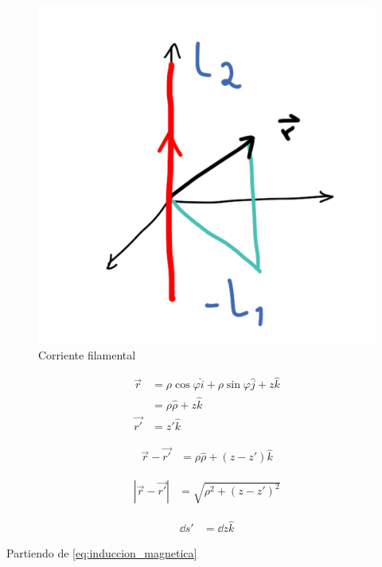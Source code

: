 \documentclass[11pt]{report}
\theoremstyle{plain}
\theoremstyle{definition}
\begin{document}
	\begin{figure}[!h]
		\centering
		\includegraphics[scale=0.15]{Ejercicio3.png}
		\caption{Corriente filamental}
		\label{fig:Ejercicio3}
	\end{figure}

\begin{align*} %
	\vec{r} &= \rho\cos{\varphi}\hat{i} + \rho\sin{\varphi}\hat{j} + z\hat{k}\\
	&= \rho\hat{\rho} + z\hat{k}\\
	\vec{r'} &= z'\hat{k}
\end{align*}

\begin{align*} %
	\vec{r} -\vec{r'} &= \rho\hat{\rho} + \left(z- z'\right)\hat{k}
\end{align*}

\begin{align*} %
	|\vec{r} -\vec{r'}| &= \sqrt{\rho^2 + \left(z- z'\right)^2}
\end{align*}

\begin{align*} %
	\dd{s'} &= \dd{z}\hat{k}
\end{align*}


Partiendo de \ref{eq:induccion_magnetica}
\end{document}
